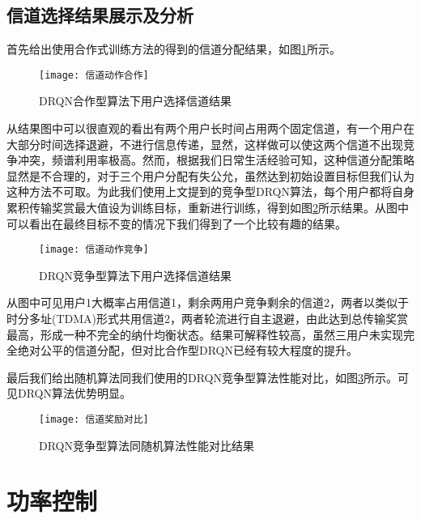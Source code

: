 \subsection{信道选择结果展示及分析}
首先给出使用合作式训练方法的得到的信道分配结果，如图\ref{fig:信道动作合作}所示。
\begin{figure}[htbp]
	\centering
	\texttt{[image: 信道动作合作]}
	\caption{DRQN合作型算法下用户选择信道结果}
	\label{fig:信道动作合作}
\end{figure}
从结果图中可以很直观的看出有两个用户长时间占用两个固定信道，有一个用户在大部分时间选择退避，不进行信息传递，显然，这样做可以使这两个信道不出现竞争冲突，频谱利用率极高。然而，根据我们日常生活经验可知，这种信道分配策略显然是不合理的，对于三个用户分配有失公允，虽然达到初始设置目标但我们认为这种方法不可取。为此我们使用上文提到的竞争型DRQN算法，每个用户都将自身累积传输奖赏最大值设为训练目标，重新进行训练，得到如图\ref{fig:信道动作竞争}所示结果。从图中可以看出在最终目标不变的情况下我们得到了一个比较有趣的结果。
\begin{figure}[htbp]
	\centering
	\texttt{[image: 信道动作竞争]}
	\caption{DRQN竞争型算法下用户选择信道结果}
	\label{fig:信道动作竞争}
\end{figure}
从图中可见用户1大概率占用信道1，剩余两用户竞争剩余的信道2，两者以类似于时分多址(TDMA)形式共用信道2，两者轮流进行自主退避，由此达到总传输奖赏最高，形成一种不完全的纳什均衡状态。结果可解释性较高，虽然三用户未实现完全绝对公平的信道分配，但对比合作型DRQN已经有较大程度的提升。

最后我们给出随机算法同我们使用的DRQN竞争型算法性能对比，如图\ref{fig:信道奖励对比}所示。可见DRQN算法优势明显。
\begin{figure}[htbp]
	\centering
	\texttt{[image: 信道奖励对比]}
	\caption{DRQN竞争型算法同随机算法性能对比结果}
	\label{fig:信道奖励对比}
\end{figure}

\section{功率控制}
